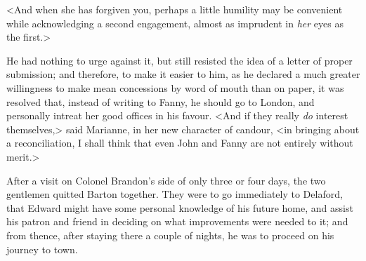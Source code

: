 <And when she has forgiven you, perhaps a little humility may be convenient while acknowledging a second engagement, almost as imprudent in \textit{her} eyes as the first.>

He had nothing to urge against it, but still resisted the idea of a letter of proper submission; and therefore, to make it easier to him, as he declared a much greater willingness to make mean concessions by word of mouth than on paper, it was resolved that, instead of writing to Fanny, he should go to London, and personally intreat her good offices in his favour. <And if they really \textit{do} interest themselves,> said Marianne, in her new character of candour, <in bringing about a reconciliation, I shall think that even John and Fanny are not entirely without merit.>

After a visit on Colonel Brandon's side of only three or four days, the two gentlemen quitted Barton together. They were to go immediately to Delaford, that Edward might have some personal knowledge of his future home, and assist his patron and friend in deciding on what improvements were needed to it; and from thence, after staying there a couple of nights, he was to proceed on his journey to town.